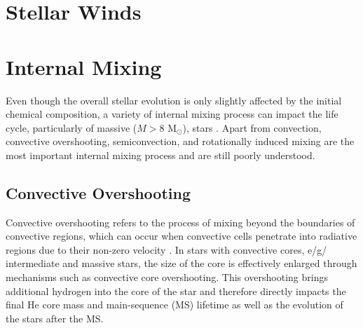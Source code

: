 \section{Stellar Winds}



\section{Internal Mixing}\label{sub:mixing}

Even though the overall stellar evolution is only slightly affected by the initial chemical composition, a variety of internal mixing process can impact the life cycle, particularly of massive ($M>8$ M$_{\odot}$), stars \citep{langer2012presupernova}. Apart from convection, convective overshooting, semiconvection, and rotationally induced mixing are the most important internal mixing process \citep{schootemeijer2019constraining} and are still poorly understood. 

\subsection{Convective Overshooting}

Convective overshooting refers to the process of mixing beyond the boundaries of convective regions, which can occur when convective cells penetrate into radiative regions due to their non-zero velocity \citep{alongi1993evolutionary,brott2011rotating,schootemeijer2019constraining}. In stars with convective cores, e/g/ intermediate and massive stars, the size of the core is effectively enlarged through mechanisms such as convective core overshooting. This overshooting brings additional hydrogen into the core of the star and therefore directly impacts the final He core mass and main-sequence (MS) lifetime as well as the evolution of the stars after the MS.


